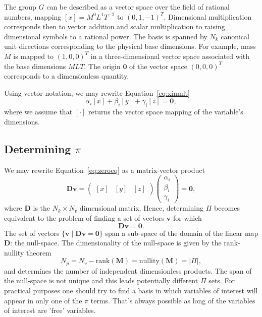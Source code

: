 \documentclass[11pt]{article}
\begin{document}
The group $G$ can be described as a vector space over the field of rational numbers, mapping $[x] = M^0L^1T^{-2}$ to $(0,1,-1)^T$. Dimensional multiplication corresponds then to vector addition and scalar multiplication to raising dimensional symbols to a rational power. The basis is spanned by $N_k$ canonical unit directions corresponding to the physical base dimensions. For example, mass $M$ is mapped to $(1,0,0)^T$ in a three-dimensional vector space associated with the base dimensions $MLT$. The origin $\mathbf{0}$ of the vector space $(0,0,0)^T$ corresponds to a dimensionless quantity.

Using vector notation, we may rewrite Equation~\ref{eq:xinmlt}
\begin{equation}
    \alpha_i[x] + \beta_i[y] + \gamma_i[z] = \mathbf{0}, \label{eq:zeroeq}
\end{equation}
where we assume that $\left[\cdot\right]$ returns the vector space mapping of the variable's dimensions. 

\subsection{Determining $\pi$}

We may rewrite Equation~\ref{eq:zeroeq} as a matrix-vector product
\begin{equation}
    \mathbf{D}\mathbf{v} =\begin{pmatrix}[x] & [y] & [z]\end{pmatrix}\begin{pmatrix} \alpha_i \\ \beta_i \\ \gamma_i\end{pmatrix} = \mathbf{0},
\end{equation}
where $\mathbf{D}$ is the $N_k \times N_v$ dimensional matrix. Hence, determining $\Pi$ becomes equivalent to the problem of finding a set of vectors $\mathbf{v}$ for which
\begin{equation}
    \mathbf{D}\mathbf{v}=\mathbf{0}.
\end{equation}
The set of vectors $\{\mathbf{v} \mid \mathbf{D}\mathbf{v}=\mathbf{0}\}$ span a sub-space of the domain of the linear map $\mathbf{D}$: the null-space. The dimensionality of the null-space is given by the rank-nullity theorem
\begin{equation}
    N_p = N_v - \text{rank}(\mathbf{M}) = \text{nullity}(\mathbf{M}) = |\Pi|,
\end{equation}
and determines the number of independent dimensionless products. The span of the null-space is not unique and this leads potentially different $\Pi$ sets. For practical purposes one should try to find a basis in which variables of interest will appear in only one of the $\pi$ terms. That's always possible as long of the variables of interest are 'free' variables. 
\end{document}
